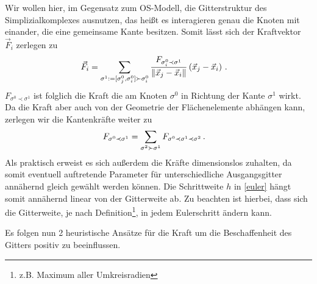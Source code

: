     Wir wollen hier, im Gegensatz zum OS-Modell, die Gitterstruktur des Simplizialkomplexes ausnutzen, das heißt es interagieren genau die Knoten mit einander, die eine gemeinsame Kante besitzen. Somit lässt sich der Kraftvektor \( \vec{F}_{i} \) zerlegen zu
  \begin{align}
    \vec{F}_{i} &= \sum_{\sigma^{1}:=[\sigma^{0}_{j}, \sigma^{0}_{i}]\succ\sigma^{0}_{i}} 
                                  \frac{F_{\sigma^{0}_{i}\prec\sigma^{1}}}{\|\vec{x}_{j} - \vec{x}_{i}\|} \left(\vec{x}_{j} - \vec{x}_{i}\right)
    \,\text{.}
  \end{align}
  \( F_{\sigma^{0}\prec\sigma^{1}} \) ist folglich die Kraft die am Knoten \( \sigma^{0} \) in Richtung der Kante \( \sigma^{1} \) wirkt. 
  Da die Kraft aber auch von der Geometrie der Flächenelemente abhängen kann, zerlegen wir die Kantenkräfte weiter zu
  \begin{align}
    F_{\sigma^{0}\prec\sigma^{1}} &= \sum_{\sigma^{2}\succ\sigma^{1}} F_{\sigma^{0}\prec\sigma^{1}\prec\sigma^{2}}
    \,\text{.}
  \end{align}
  Als praktisch erweist es sich außerdem die Kräfte dimensionslos zuhalten, da somit eventuell auftretende Parameter für unterschiedliche
  Ausgangsgitter annähernd gleich gewählt werden können. 
  Die Schrittweite \( h \) in \eqref{euler} hängt somit annähernd linear von der Gitterweite ab. 
  Zu beachten ist hierbei, dass sich die Gitterweite, je nach Definition\footnote{z.B. Maximum aller Umkreisradien}, in jedem Eulerschritt ändern kann.

  Es folgen nun 2 heuristische Ansätze für die Kraft um die Beschaffenheit des Gitters positiv zu beeinflussen.

